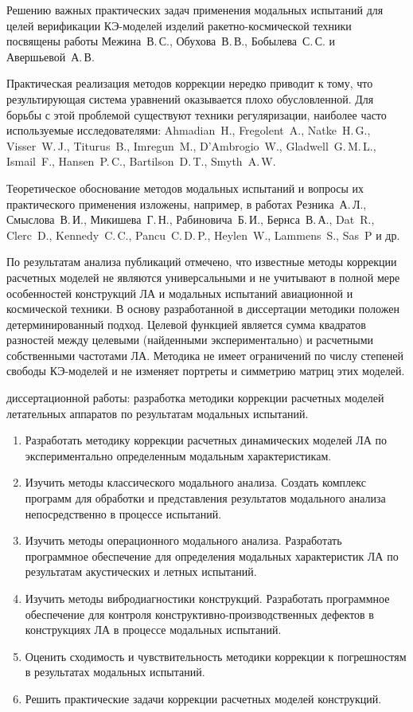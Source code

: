 Решению важных практических задач применения модальных испытаний для целей верификации КЭ-моделей изделий ракетно-космической техники посвящены работы Межина~В.\,С., Обухова~В.\,В., Бобылева~С.\,С. и Авершьевой~А.\,В.

Практическая реализация методов коррекции нередко приводит к тому, что результирующая система уравнений оказывается плохо обусловленной. Для борьбы с этой проблемой существуют техники регуляризации, наиболее часто используемые исследователями: Ahmadian~H., Fregolent~A., Natke~H.\,G., Visser~W.\,J., Titurus~B., Imregun~M., D'Ambrogio~W., Gladwell~G.\,M.\,L., Ismail~F., Hansen~P.\,C., Bartilson~D.\,T., Smyth~A.\,W.

Теоретическое обоснование методов модальных испытаний и вопросы их практического применения изложены, например, в работах Резника~А.\,Л., Смыслова~В.\,И., Микишева~Г.\,Н., Рабиновича~Б.\,И., Бернса~В.\,А., Dat~R., Clerc~D., Kennedy~C.\,C., Pancu~C.\,D.\,P., Heylen~W., Lammens~S., Sas~P и др.

По результатам анализа публикаций отмечено, что известные методы коррекции расчетных моделей не являются универсальными и не учитывают в полной мере особенностей конструкций ЛА и модальных испытаний авиационной и космической техники. В основу разработанной в диссертации методики положен детерминированный подход. Целевой функцией является сумма квадратов разностей между целевыми (найденными экспериментально) и расчетными собственными частотами ЛА. Методика не имеет ограничений по числу степеней свободы КЭ-моделей и не изменяет портреты и симметрию матриц этих моделей.

{\aim} диссертационной работы: разработка методики коррекции расчетных моделей летательных аппаратов по результатам модальных испытаний. 

{\tasks}
\begin{enumerate}[beginpenalty = 10000] 
	\item Разработать методику коррекции расчетных динамических моделей ЛА по экспериментально определенным модальным характеристикам.
	\item Изучить методы классического модального анализа. Создать комплекс программ для обработки и представления результатов модального анализа непосредственно в процессе испытаний.
	\item Изучить методы операционного модального анализа. Разработать программное обеспечение для определения модальных характеристик ЛА по результатам акустических и летных испытаний.
	\item Изучить методы вибродиагностики конструкций. Разработать программное обеспечение для контроля конструктивно-производственных дефектов в конструкциях ЛА в процессе модальных испытаний.
	\item Оценить сходимость и чувствительность методики коррекции к погрешностям в результатах модальных испытаний.
	\item Решить практические задачи коррекции расчетных моделей конструкций.
\end{enumerate}

